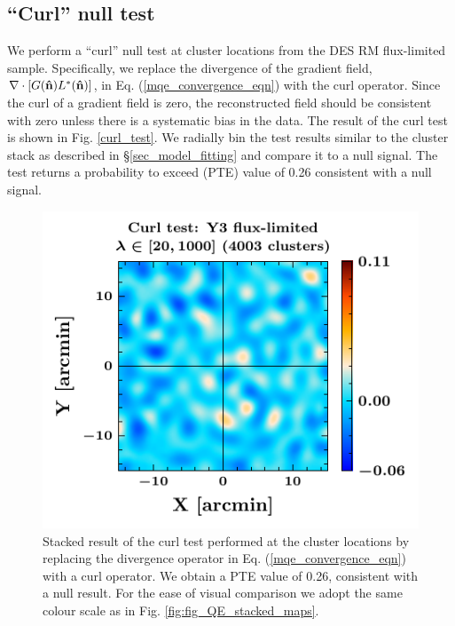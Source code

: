 \subsection{``Curl'' null test}\label{sec_null_tests}

We perform a ``curl'' null test \citep{hu07} at \howmanyclustersinfullsample{} cluster locations from the DES RM \whichyear{} flux-limited sample.
Specifically, we replace the divergence of the gradient field, $\nabla \cdot [G(\bm{\hat{\mbox{n}}}) L^{*}(\bm{\hat{\mbox{n}}})]$, in Eq. (\ref{mqe_convergence_eqn}) with the curl operator. 
Since the curl of a gradient field is zero, the reconstructed field should be consistent with zero unless there is a systematic bias in the data. 
The result of the curl test is shown in Fig. \ref{curl_test}. 
We radially bin the test results similar to the cluster stack as described in \S\ref{sec_model_fitting} and compare it to a null signal.
The test returns a probability to exceed (PTE) value of 0.26 consistent with a null signal.

\begin{figure}[ht]
\includegraphics[width=\linewidth]{figs/kappa_model_MF_y3_v6_4_22_full_curl_test_JODY.pdf}
\caption{Stacked result of the curl test performed at the cluster locations by replacing the divergence operator in Eq. (\ref{mqe_convergence_eqn}) with a curl operator. %
We obtain a PTE value of 0.26, consistent with a null result.
For the ease of visual comparison we adopt the same colour scale as in Fig. \ref{fig:fig_QE_stacked_maps}.
}
\end{figure}
\label{curl_test}
